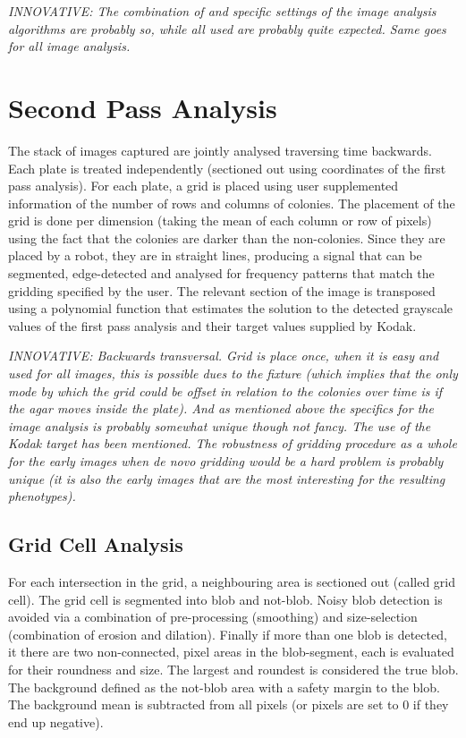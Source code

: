 \documentclass{article}
\newcommand{\innovative}[1]{\emph{INNOVATIVE: #1}}
\begin{document}
\innovative{The combination of and specific settings of the 
image analysis algorithms are probably so, while all used are probably
quite expected. Same goes for all image analysis.}

\section{Second Pass Analysis}

The stack of images captured are jointly analysed traversing time backwards.
Each plate is treated independently (sectioned out using coordinates of 
the first pass analysis).
For each plate, a grid is placed using user supplemented information of the
number of rows and columns of colonies.
The placement of the grid is done per dimension (taking the mean of each
column or row of pixels) using the fact that the
colonies are darker than the non-colonies.
Since they are placed by a robot, they are in straight lines, producing
a signal that can be segmented, edge-detected and analysed for frequency
patterns that match the gridding specified by the user.
The relevant section of the image is transposed using a polynomial function
that estimates the solution to the detected grayscale values of the first
pass analysis and their target values supplied by Kodak.

\innovative{Backwards transversal.
Grid is place once, when it is easy and used for all images, this is 
possible dues to the fixture (which implies that the only mode by 
which the grid could be offset in relation to the colonies over time 
is if the agar moves inside the plate).
And as mentioned above the specifics
for the image analysis is probably somewhat unique though not fancy.
The use of the Kodak target has been mentioned.
The robustness of gridding procedure as a whole for the early images
when \emph{de novo} gridding would be a hard problem is probably
unique (it is also the early images that are the most interesting
for the resulting phenotypes).}

\subsection{Grid Cell Analysis}

For each intersection in the grid, a neighbouring area is sectioned out (called
grid cell).
The grid cell is segmented into blob and not-blob.
Noisy blob detection is avoided via a combination of pre-processing (smoothing) 
and size-selection (combination of erosion and dilation).
Finally if more than one blob is detected, it there are two non-connected,
pixel areas in the blob-segment, each is evaluated for their roundness and size.
The largest and roundest is considered the true blob.
The background defined as the not-blob area with a safety margin to the blob.
The background mean is subtracted from all pixels (or pixels are set to 0 if
they end up negative).
\end{document}
